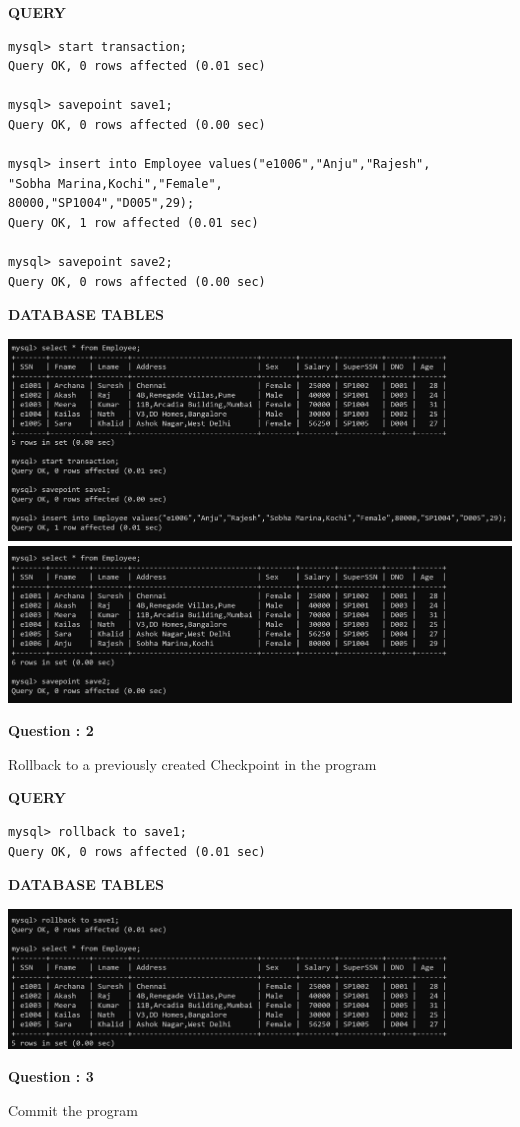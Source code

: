 \documentclass[a4paper,12pt]{report}
\begin{document}
\begin{flushleft}
\textbf{QUERY }
\end{flushleft}
 \begin{verbatim}
mysql> start transaction;
Query OK, 0 rows affected (0.01 sec)

mysql> savepoint save1;
Query OK, 0 rows affected (0.00 sec)

mysql> insert into Employee values("e1006","Anju","Rajesh",
"Sobha Marina,Kochi","Female",
80000,"SP1004","D005",29);
Query OK, 1 row affected (0.01 sec)

mysql> savepoint save2;
Query OK, 0 rows affected (0.00 sec)
\end{verbatim}
\begin{flushleft}
\textbf{DATABASE TABLES}
\end{flushleft}
\includegraphics[scale=0.3]{tcl1.png}
\includegraphics[scale=0.3]{tcl2.png}

\begin{flushleft}
    \textbf{Question : 2}
\end{flushleft}
Rollback to a previously created Checkpoint in the program

\begin{flushleft}
\textbf{QUERY }
\end{flushleft}
 \begin{verbatim}
mysql> rollback to save1;
Query OK, 0 rows affected (0.01 sec)

\end{verbatim}
\begin{flushleft}
\textbf{DATABASE TABLES}
\end{flushleft}
\includegraphics[scale=0.3]{tcl3.png}
\begin{flushleft}
    \textbf{Question : 3}
\end{flushleft}
Commit the program
\end{document}
